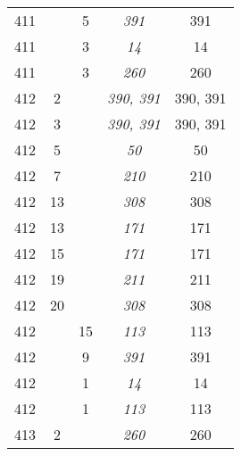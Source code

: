 \documentclass[a4paper,11pt]{article}
\begin{document}
\begin{center}
\begin{tabular}{|c|c|c|c|c|}
    411 & &  5 & \emph{391} & 391 \\
    411 & &  3 & \emph{14}  & 14 \\
    411 & &  3 & \emph{260} & 260 \\
    412 &  2 & & \emph{390, 391} & 390, 391 \\
    412 &  3 & & \emph{390, 391} & 390, 391 \\
    412 &  5 & & \emph{50}  & 50 \\
    412 &  7 & & \emph{210} & 210 \\
    412 & 13 & & \emph{308} & 308 \\
    412 & 13 & & \emph{171} & 171 \\
    412 & 15 & & \emph{171} & 171 \\
    412 & 19 & & \emph{211} & 211 \\
    412 & 20 & & \emph{308} & 308 \\
    412 & & 15 & \emph{113} & 113 \\
    412 & &  9 & \emph{391} & 391 \\
    412 & &  1 & \emph{14}  & 14 \\
    412 & &  1 & \emph{113} & 113 \\
    413 &  2 & & \emph{260} & 260 \\
    \hline
  \end{tabular}


\end{center}
\end{document}
